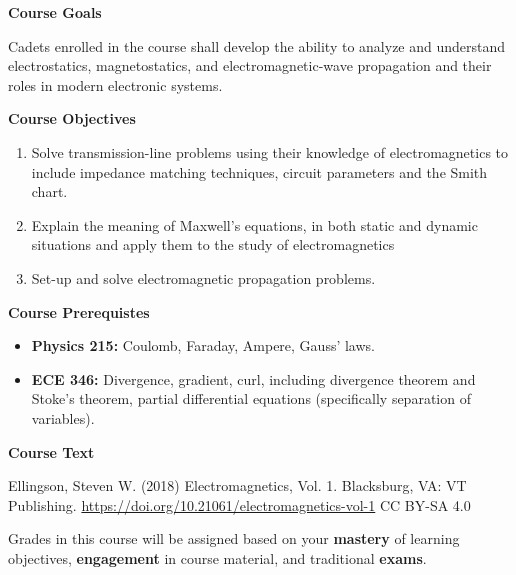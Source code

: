 \documentclass[12pt]{article}
\begin{document}
\textbf{Course Goals}

	Cadets enrolled in the course shall develop the ability to analyze and understand electrostatics, magnetostatics, and electromagnetic-wave propagation and their roles in modern electronic systems.

\textbf{Course Objectives}
	\vspace{-12pt}
	\begin{enumerate}
		\item Solve transmission-line problems using their knowledge of electromagnetics to include impedance matching techniques, circuit parameters and the Smith chart.
		\item Explain the meaning of Maxwell’s equations, in both static and dynamic situations and apply them to the study of electromagnetics
		\item Set-up and solve electromagnetic propagation problems.
	\end{enumerate}
	\vspace{-12pt}

\textbf{Course Prerequistes} 
\vspace{-12pt}
\begin{itemize}
	\item \textbf{Physics 215:} Coulomb, Faraday, Ampere,  Gauss’ laws.
	\item \textbf{ECE 346:} Divergence, gradient, curl, including divergence theorem and Stoke’s theorem, partial differential equations (specifically separation of variables).
\end{itemize}
	
\textbf{Course Text} 

Ellingson, Steven W. (2018) Electromagnetics, Vol. 1. Blacksburg, VA: VT Publishing. \href{https://doi.org/10.21061/electromagnetics-vol-1}{https://doi.org/10.21061/electromagnetics-vol-1} CC BY-SA 4.0

\newpage
{}

\begin{small} 
Grades in this course will be assigned based on your \textbf{mastery} of learning objectives, \textbf{engagement} in course material, and traditional \textbf{exams}. 
\end{small}

\vspace{-0.1in}
\end{document}
